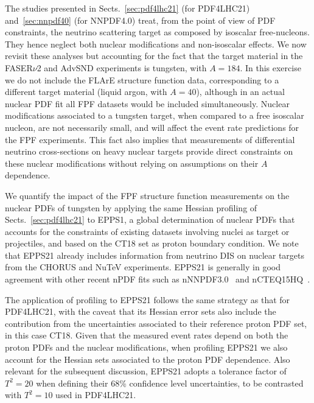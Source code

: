 The studies presented in Sects.~\ref{sec:pdf4lhc21} (for PDF4LHC21)
and~\ref{sec:nnpdf40} (for NNPDF4.0) treat, from the point of view
of PDF constraints, the neutrino scattering target
as composed by isoscalar free-nucleons.
%
They hence neglect both nuclear modifications and non-isoscalar effects.
%
We now revisit these analyses but accounting for the fact that the target material
in the FASER$\nu$2 and AdvSND experiments is tungsten, with $A=184$.
%
In this exercise we do not include the FLArE structure function data,
corresponding to a different target material (liquid argon, with $A=40$), although
in an actual nuclear PDF fit all FPF datasets would be included simultaneously.
%
Nuclear modifications associated to a tungsten target, when compared
to a free isoscalar nucleon, are not necessarily small, and  will affect the event rate predictions for
the FPF experiments.
%
This fact also implies that  measurements of differential neutrino cross-sections
on heavy nuclear targets provide direct constraints on these nuclear modifications
without relying on assumptions on their $A$ dependence.

We quantify the impact of the FPF structure function measurements
on the nuclear PDFs of tungsten by applying the same Hessian profiling
of Sects.~\ref{sec:pdf4lhc21} to EPPS1, a global determination of nuclear PDFs
that accounts for the constraints of existing datasets involving nuclei as target or projectiles,
and based on the CT18 set as proton boundary condition.
%
We note that EPPS21 already includes information from neutrino DIS on nuclear targets
from the CHORUS and NuTeV experiments.
%
EPPS21 is generally in good agreement with other recent nPDF fits such as nNNPDF3.0~\cite{AbdulKhalek:2022fyi}
and nCTEQ15HQ~\cite{Duwentaster:2022kpv}.

The application of profiling to EPPS21 follows the same strategy as that
for PDF4LHC21, with the caveat that its Hessian error sets also include the contribution
from the uncertainties  associated to their reference proton PDF set, in this case CT18.
%
Given that the measured event rates depend on both the proton PDFs and the nuclear modifications,
when profiling EPPS21 we also account for the Hessian sets associated to the proton
PDF dependence.
%
Also relevant for the subsequent discussion, EPPS21 adopts a tolerance
factor of $T^2 = 20$ when defining their  68\%  confidence level uncertainties,
to be contrasted with  $T^2 = 10$ used in PDF4LHC21.
 
